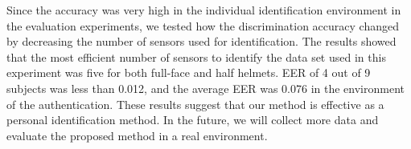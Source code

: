 \documentclass[sigchi,authordraft]{acmart}
\providecommand\BibTeX{{%
    \normalfont B\kern-0.5em{\scshape i\kern-0.25em b}\kern-0.8em\TeX}}}
\begin{document}

Since the accuracy was very high in the individual identification environment in the evaluation experiments, we tested how the discrimination accuracy changed by decreasing the number of sensors used for identification. The results showed that the most efficient number of sensors to identify the data set used in this experiment was five for both full-face and half helmets. EER of 4 out of 9 subjects was less than 0.012, and the average EER was 0.076 in the environment of the authentication. These results suggest that our method is effective as a personal identification method. In the future, we will collect more data and evaluate the proposed method in a real environment.




\end{document}
